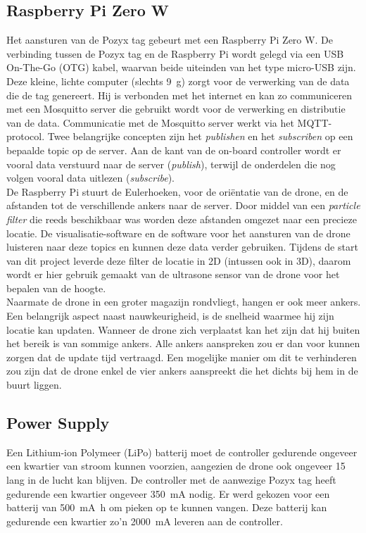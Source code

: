 \subsection{Raspberry Pi Zero W} \label{sec:zerow}
Het aansturen van de Pozyx tag gebeurt met een Raspberry Pi Zero W.
De verbinding tussen de Pozyx tag en de Raspberry Pi wordt gelegd via een USB On-The-Go (OTG) kabel, waarvan beide uiteinden van het type micro-USB zijn.
Deze kleine, lichte computer (slechts \SI{9}{\g}) zorgt voor de verwerking van de data die de tag genereert.
Hij is verbonden met het internet en kan zo communiceren met een Mosquitto server die gebruikt wordt voor de verwerking en distributie van de data.
Communicatie met de Mosquitto server werkt via het MQTT-protocol.
Twee belangrijke concepten zijn het \textit{publishen} en het \textit{subscriben} op een bepaalde topic op de server.
Aan de kant van de on-board controller wordt er vooral data verstuurd naar de server (\textit{publish}), terwijl de onderdelen die nog volgen vooral data uitlezen (\textit{subscribe}).\\

De Raspberry Pi stuurt de Eulerhoeken, voor de oriëntatie van de drone, en de afstanden tot de verschillende ankers naar de server.
Door middel van een \textit{particle filter} die reeds beschikbaar was worden deze afstanden omgezet naar een precieze locatie. De visualisatie-software en de software voor het aansturen van de drone luisteren naar deze topics en kunnen deze data verder gebruiken.
Tijdens de start van dit project leverde deze filter de locatie in 2D (intussen ook in 3D), daarom wordt er hier gebruik gemaakt van de ultrasone sensor van de drone voor het bepalen van de hoogte.\\

Naarmate de drone in een groter magazijn rondvliegt, hangen er ook meer ankers.
Een belangrijk aspect naast nauwkeurigheid, is de snelheid waarmee hij zijn locatie kan updaten.
Wanneer de drone zich verplaatst kan het zijn dat hij buiten het bereik is van sommige ankers.
Alle ankers aanspreken zou er dan voor kunnen zorgen dat de update tijd vertraagd.
Een mogelijke manier om dit te verhinderen zou zijn dat de drone enkel de vier ankers aanspreekt die het dichts bij hem in de buurt liggen.

\subsection{Power Supply} \label{sec:power_supply}
Een Lithium-ion Polymeer (LiPo) batterij moet de controller gedurende ongeveer een kwartier van stroom kunnen voorzien, aangezien de drone ook ongeveer \SI{15}{\min} lang in de lucht kan blijven.
De controller met de aanwezige Pozyx tag heeft gedurende een kwartier ongeveer \SI{350}{\mA} nodig.
Er werd gekozen voor een batterij van \SI{500}{\mA\hour} om pieken op te kunnen vangen.
Deze batterij kan gedurende een kwartier zo'n \SI{2000}{\mA} leveren aan de controller.\\

